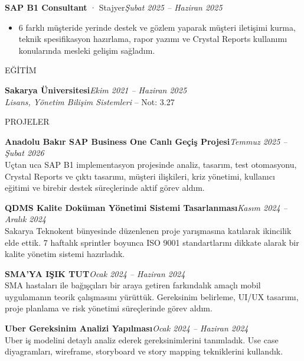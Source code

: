 \documentclass[a4paper,8pt]{extarticle}
\newcommand{\cvsection}[1]{%
  \vspace{4pt}%
  \noindent\colorbox{cvbluelight}{\parbox{\dimexpr\textwidth-2\fboxsep}{\color{cvblue}\bfseries\strut #1\strut}}%
  \par\vspace{2pt}%
}
\begin{document}
\vspace{2pt}
{\small\textbf{SAP B1 Consultant} · Stajyer\hfill\textit{Şubat 2025 -- Haziran 2025}}
\begin{itemize}
\item {\small 6 farklı müşteride yerinde destek ve gözlem yaparak müşteri iletişimi kurma, teknik spesifikasyon hazırlama, rapor yazımı ve Crystal Reports kullanımı konularında mesleki gelişim sağladım.}
\end{itemize}

\cvsection{EĞİTİM}

\textbf{Sakarya Üniversitesi}\hfill{\small\textit{Ekim 2021 -- Haziran 2025}}\\
{\small\textit{Lisans, Yönetim Bilişim Sistemleri} -- Not: 3.27}

\cvsection{PROJELER}

\textbf{Anadolu Bakır SAP Business One Canlı Geçiş Projesi}\hfill{\small\textit{Temmuz 2025 -- Şubat 2026}}\\
{\small Uçtan uca SAP B1 implementasyon projesinde analiz, tasarım, test otomasyonu, Crystal Reports ve çıktı tasarımı, müşteri ilişkileri, kriz yönetimi, kullanıcı eğitimi ve birebir destek süreçlerinde aktif görev aldım.}

\vspace{2pt}
\textbf{QDMS Kalite Doküman Yönetimi Sistemi Tasarlanması}\hfill{\small\textit{Kasım 2024 -- Aralık 2024}}\\
{\small Sakarya Teknokent bünyesinde düzenlenen proje yarışmasına katılarak ikincilik elde ettik. 7 haftalık sprintler boyunca ISO 9001 standartlarını dikkate alarak bir kalite yönetim sistemi hazırladık.}

\vspace{2pt}
\textbf{SMA'YA IŞIK TUT}\hfill{\small\textit{Ocak 2024 -- Haziran 2024}}\\
{\small SMA hastaları ile bağışçıları bir araya getiren farkındalık amaçlı mobil uygulamanın teorik çalışmasını yürüttük. Gereksinim belirleme, UI/UX tasarımı, proje planlama ve risk yönetimi süreçlerinde görev aldım.}

\vspace{2pt}
\textbf{Uber Gereksinim Analizi Yapılması}\hfill{\small\textit{Ocak 2024 -- Haziran 2024}}\\
{\small Uber iş modelini detaylı analiz ederek gereksinimlerini tanımladık. Use case diyagramları, wireframe, storyboard ve story mapping tekniklerini kullandık.}
\end{document}
